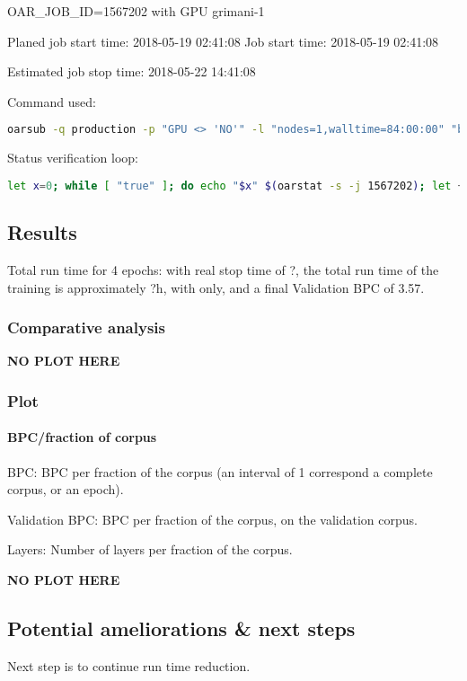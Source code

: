 OAR\_JOB\_ID=1567202 with GPU grimani-1

Planed job start time: 2018-05-19 02:41:08 Job start time: 2018-05-19
02:41:08

Estimated job stop time: 2018-05-22 14:41:08

Command used:

\begin{lstlisting}[language=bash]
oarsub -q production -p "GPU <> 'NO'" -l "nodes=1,walltime=84:00:00" "bash runmsnn.sh"
\end{lstlisting}

Status verification loop:

\begin{lstlisting}[language=bash]
let x=0; while [ "true" ]; do echo "$x" $(oarstat -s -j 1567202); let ++x; sleep 120; done
\end{lstlisting}

\subsection{Results}

Total run time for 4 epochs: with real stop time of ?, the total run
time of the training is approximately ?h, with only, and a final
Validation BPC of 3.57.

\subsubsection{Comparative analysis}

\textbf{NO PLOT HERE}

\subsubsection{Plot}

\paragraph{BPC/fraction of corpus}

BPC: BPC per fraction of the corpus (an interval of 1 correspond a
complete corpus, or an epoch).

Validation BPC: BPC per fraction of the corpus, on the validation
corpus.

Layers: Number of layers per fraction of the corpus. 

\textbf{NO PLOT HERE}

\subsection{Potential ameliorations \& next steps}

Next step is to continue run time reduction.
